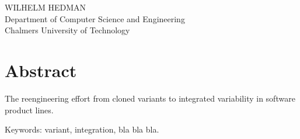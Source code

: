 \fullt\\
\subt\\
WILHELM HEDMAN\\
Department of Computer Science and Engineering\\
Chalmers University of Technology \setlength{\parskip}{0.5cm}

\thispagestyle{plain}			%
\setlength{\parskip}{0pt plus 1.0pt}
\section*{Abstract}
The reengineering effort from cloned variants to integrated variability in software product lines. 

\vfill
Keywords: variant, integration, bla bla bla.

\newpage				%
\thispagestyle{empty}
\mbox{}